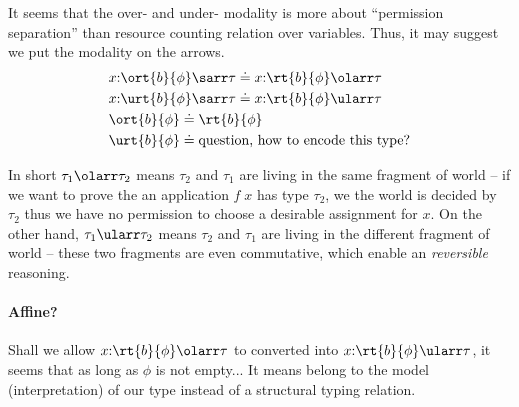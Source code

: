 It seems that the over- and under- modality is more about ``permission separation'' than resource counting relation over variables. Thus, it may suggest we put the modality on the arrows.
\begin{align*}
    &x{:}\ort{b}{\phi} \sarr \tau \doteq x{:}\rt{b}{\phi} \olarr \tau\\
    &x{:}\urt{b}{\phi} \sarr \tau \doteq x{:}\rt{b}{\phi} \ularr \tau\\
    &\ort{b}{\phi} \doteq \rt{b}{\phi} \\
    &\urt{b}{\phi} \doteq \text{question, how to encode this type?}
\end{align*}\noindent

In short $\tau_1 \olarr \tau_2$ means $\tau_2$ and $\tau_1$ are living in the same fragment of world -- if we want to prove the an application $f\;x$ has type $\tau_2$, we the world is decided by $\tau_2$ thus we have no permission to choose a desirable assignment for $x$. On the other hand, $\tau_1 \ularr \tau_2$ means $\tau_2$ and $\tau_1$ are living in the different fragment of world -- these two fragments are even commutative, which enable an \emph{reversible} reasoning.

\paragraph{Affine?} Shall we allow $x{:}\rt{b}{\phi} \olarr \tau$ to converted into $x{:}\rt{b}{\phi} \ularr \tau$, it seems that as long as $\phi$ is not empty... It means belong to the model (interpretation) of our type instead of a structural typing relation.

